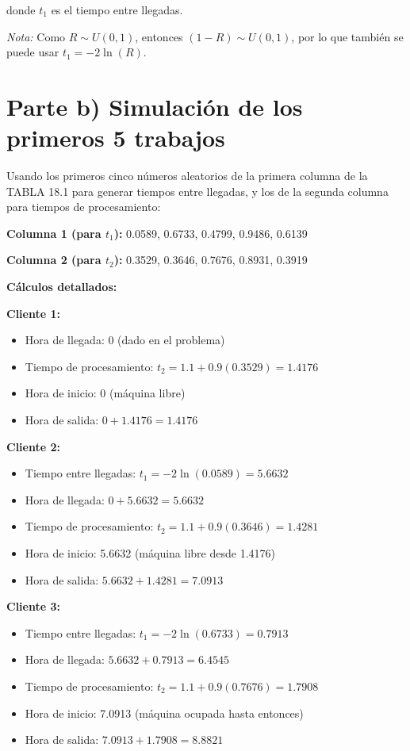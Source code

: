 \documentclass{article}
\begin{document}
donde $t_1$ es el tiempo entre llegadas.

\textit{Nota:} Como $R \sim U(0,1)$, entonces $(1-R) \sim U(0,1)$, por lo que también se puede usar $t_1 = -2\ln(R)$.

\newpage

\section*{Parte b) Simulación de los primeros 5 trabajos}

Usando los primeros cinco números aleatorios de la primera columna de la TABLA 18.1 para generar tiempos entre llegadas, y los de la segunda columna para tiempos de procesamiento:

\textbf{Columna 1 (para $t_1$):} 0.0589, 0.6733, 0.4799, 0.9486, 0.6139

\textbf{Columna 2 (para $t_2$):} 0.3529, 0.3646, 0.7676, 0.8931, 0.3919

\vspace{0.5cm}
\textbf{Cálculos detallados:}

\vspace{0.3cm}
\textbf{Cliente 1:}
\begin{itemize}
    \item Hora de llegada: 0 (dado en el problema)
    \item Tiempo de procesamiento: $t_2 = 1.1 + 0.9(0.3529) = 1.4176$
    \item Hora de inicio: 0 (máquina libre)
    \item Hora de salida: $0 + 1.4176 = 1.4176$
\end{itemize}

\textbf{Cliente 2:}
\begin{itemize}
    \item Tiempo entre llegadas: $t_1 = -2\ln(0.0589) = 5.6632$
    \item Hora de llegada: $0 + 5.6632 = 5.6632$
    \item Tiempo de procesamiento: $t_2 = 1.1 + 0.9(0.3646) = 1.4281$
    \item Hora de inicio: 5.6632 (máquina libre desde 1.4176)
    \item Hora de salida: $5.6632 + 1.4281 = 7.0913$
\end{itemize}

\textbf{Cliente 3:}
\begin{itemize}
    \item Tiempo entre llegadas: $t_1 = -2\ln(0.6733) = 0.7913$
    \item Hora de llegada: $5.6632 + 0.7913 = 6.4545$
    \item Tiempo de procesamiento: $t_2 = 1.1 + 0.9(0.7676) = 1.7908$
    \item Hora de inicio: 7.0913 (máquina ocupada hasta entonces)
    \item Hora de salida: $7.0913 + 1.7908 = 8.8821$
\end{itemize}
\end{document}
